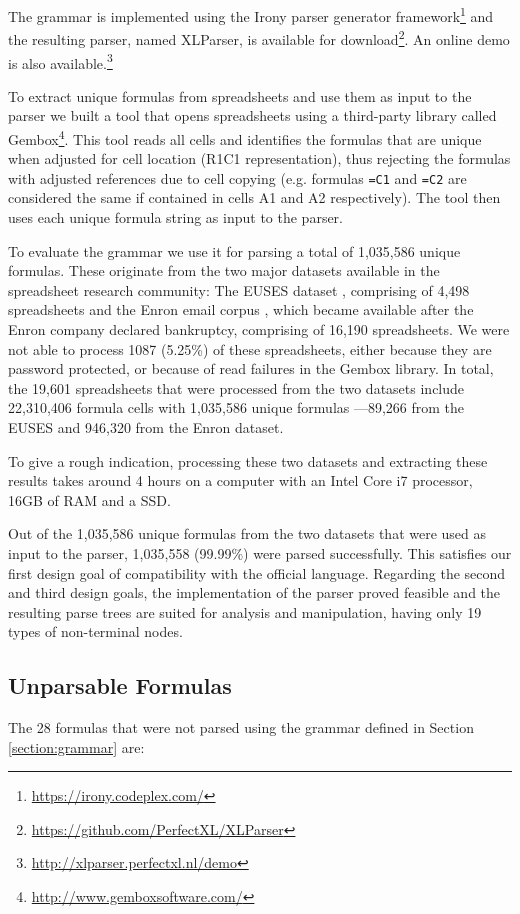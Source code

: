 \documentclass[conference]{IEEEtran}
\begin{document}
The grammar is implemented using the Irony parser generator framework\footnote{\url{https://irony.codeplex.com/}} and the resulting parser, named XLParser, is available for download\footnote{\url{https://github.com/PerfectXL/XLParser}}. An online demo is also available.\footnote{\url{http://xlparser.perfectxl.nl/demo}}

To extract unique formulas from spreadsheets and use them as input to the parser we built a tool that opens spreadsheets using a third-party library called Gembox\footnote{\url{http://www.gemboxsoftware.com/}}. This tool reads all cells and identifies the formulas that are unique when adjusted for cell location (R1C1 representation), thus rejecting the formulas with adjusted references due to cell copying (e.g. formulas \texttt{=C1} and \texttt{=C2} are considered the same if contained in cells A1 and A2 respectively). The tool then uses each unique formula string as input to the parser.

To evaluate the grammar we use it for parsing a total of 1,035,586 unique formulas. These originate from the two major datasets available in the spreadsheet research community: The EUSES dataset \cite{euses}, comprising of 4,498 spreadsheets and the Enron email corpus \cite{enron}, which became available after the Enron company declared bankruptcy, comprising of 16,190 spreadsheets. We were not able to process 1087 (5.25\%) of these spreadsheets, either because they are password protected, or because of read failures in the Gembox library. In total, the 19,601 spreadsheets that were processed from the two datasets include 22,310,406 formula cells with 1,035,586 unique formulas ---89,266 from the EUSES and 946,320 from the Enron dataset.

To give a rough indication, processing these two datasets and extracting these results takes around 4 hours on a computer with an Intel Core i7 processor, 16GB of RAM and a SSD.

Out of the 1,035,586 unique formulas from the two datasets that were used as input to the parser, 1,035,558 (99.99\%) were parsed successfully. This satisfies our first design goal of compatibility with the official language. Regarding the second and third design goals, the implementation of the parser proved feasible and the resulting parse trees are suited for analysis and manipulation, having only 19 types of non-terminal nodes.

\subsection{Unparsable Formulas}
\label{subsection:unparsableFormulas}
The 28 formulas that were not parsed using the grammar defined in Section \ref{section:grammar} are:
\end{document}

